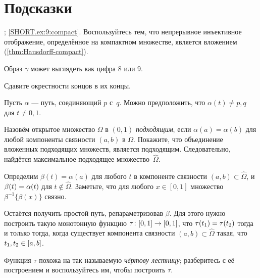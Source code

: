 \setcounter{eqtn}{0}


\chapter[Подсказки]{\vspace*{-15mm} Подсказки\vspace*{-10mm}}


\setcounter{eqtn}{0}

\parbf{\ref{ex:9}}; \ref{SHORT.ex:9:compact}.
Воспользуйтесь тем, что непрерывное инъективное отображение, определённое на компактном множестве, является вложением (\ref{thm:Hausdorff-compact}).

Образ $\gamma$ может выглядеть как цифра $8$ или $9$.

Сдавите окрестности концов в их концы.

Пусть $\alpha$ --- путь, соединяющий $p$ с~$q$.
Можно предположить, что $\alpha(t)\ne p,q$ для $t\ne0,1$.

Назовём открытое множество $\Omega$ в $(0,1)$ {}\emph{подходящим},
если $\alpha(a)=\alpha(b)$ для любой компоненты связности $(a,b)$ в $\Omega$.
Покажите, что объединение вложенных подходящих множеств, является подходящим.
Следовательно, найдётся максимальное подходящее множество~$\hat \Omega$.

Определим $\beta(t)=\alpha(a)$ для любого $t$ в компоненте связности $(a,b)\subset\hat \Omega$, и $\beta (t) \z= \alpha (t) $ для $t\notin\hat{\Omega}$.
Заметьте, что для любого $x\in [0,1]$ множество $\beta^{-1}\{\beta(x)\}$ связно.


Остаётся получить простой путь, репараметризовав $\beta$.
Для этого нужно построить такую монотонную функцию $\tau\:[0,1]\z\to[0,1]$, что 
$\tau(t_1)\z=\tau(t_2)$ тогда и только тогда, когда существует компонента связности $(a,b)\subset\hat \Omega$ такая, что $t_1,t_2\z\in [a,b]$.

Функция $\tau$ похожа на так называемую {}\emph{чёртову лестницу};
разберитесь с её построением и воспользуйтесь им, чтобы построить $\tau$.

